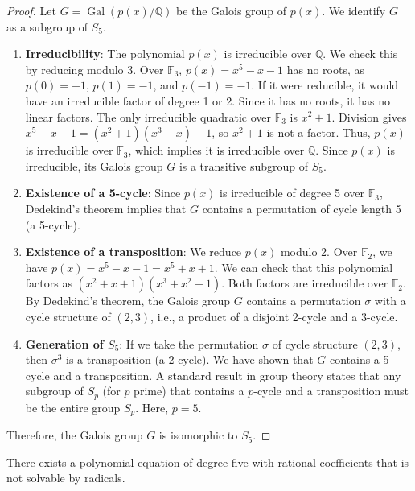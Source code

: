 \begin{proof}
    Let $G = \operatorname{Gal}(p(x)/\mathbb{Q})$ be the Galois group of $p(x)$. We identify $G$ as a subgroup of $S_5$.

    \begin{enumerate}
        \item \textbf{Irreducibility}: The polynomial $p(x)$ is irreducible over $\mathbb{Q}$. We check this by reducing modulo 3. Over $\mathbb{F}_3$, $p(x) = x^5 - x - 1$ has no roots, as $p(0) = -1$, $p(1) = -1$, and $p(-1) = -1$. If it were reducible, it would have an irreducible factor of degree 1 or 2. Since it has no roots, it has no linear factors. The only irreducible quadratic over $\mathbb{F}_3$ is $x^2+1$. Division gives $x^5 - x - 1 = (x^2+1)(x^3-x) - 1$, so $x^2+1$ is not a factor. Thus, $p(x)$ is irreducible over $\mathbb{F}_3$, which implies it is irreducible over $\mathbb{Q}$. Since $p(x)$ is irreducible, its Galois group $G$ is a transitive subgroup of $S_5$.

        \item \textbf{Existence of a 5-cycle}: Since $p(x)$ is irreducible of degree 5 over $\mathbb{F}_3$, Dedekind's theorem implies that $G$ contains a permutation of cycle length 5 (a 5-cycle).

        \item \textbf{Existence of a transposition}: We reduce $p(x)$ modulo 2. Over $\mathbb{F}_2$, we have $p(x) = x^5 - x - 1 = x^5 + x + 1$. We can check that this polynomial factors as $(x^2+x+1)(x^3+x^2+1)$. Both factors are irreducible over $\mathbb{F}_2$. By Dedekind's theorem, the Galois group $G$ contains a permutation $\sigma$ with a cycle structure of $(2,3)$, i.e., a product of a disjoint 2-cycle and a 3-cycle.

        \item \textbf{Generation of $S_5$}: If we take the permutation $\sigma$ of cycle structure $(2,3)$, then $\sigma^3$ is a transposition (a 2-cycle). We have shown that $G$ contains a 5-cycle and a transposition. A standard result in group theory states that any subgroup of $S_p$ (for $p$ prime) that contains a $p$-cycle and a transposition must be the entire group $S_p$. Here, $p=5$.
    \end{enumerate}
    Therefore, the Galois group $G$ is isomorphic to $S_5$.
\end{proof}

\begin{theorem}
    \label{thm:Specific_Abel-Ruffini}
    There exists a polynomial equation of degree five with rational coefficients that is not solvable by radicals.
\end{theorem}

